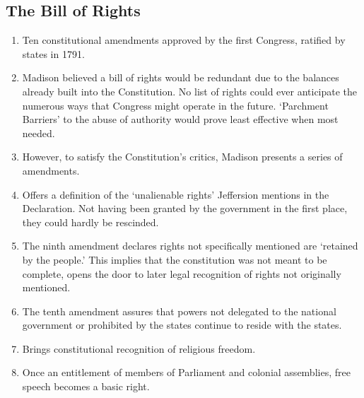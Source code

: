 \documentclass{article}
\begin{document}
    \subsection{The Bill of Rights}
      \begin{enumerate}
        \item Ten constitutional amendments approved by the first Congress, ratified by states in 1791.
        \item Madison believed a bill of rights would be redundant due to the balances already built into the Constitution. No list of rights could ever anticipate the numerous ways that Congress might operate in the future. `Parchment Barriers' to the abuse of authority would prove least effective when most needed.
        \item However, to satisfy the Constitution's critics, Madison presents a series of amendments.
        \item Offers a definition of the `unalienable rights' Jeffersion mentions in the Declaration. Not having been granted by the government in the first place, they could hardly be rescinded.
        \item The ninth amendment declares rights not specifically mentioned are `retained by the people.' This implies that the constitution was not meant to be complete, opens the door to later legal recognition of rights not originally mentioned. 
        \item The tenth amendment assures that powers not delegated to the national government or prohibited by the states continue to reside with the states.
        \item Brings constitutional recognition of religious freedom.
        \item Once an entitlement of members of Parliament and colonial assemblies, free speech becomes a basic right.
      \end{enumerate}
\end{document}
